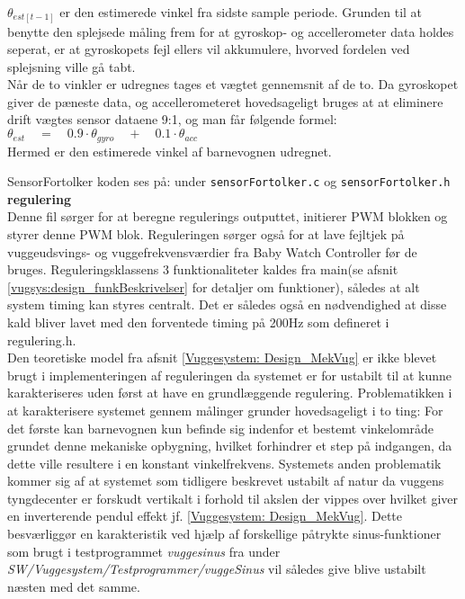 ${ \theta  }_{ est\left[ t-1 \right]  }$ er den estimerede vinkel fra sidste sample periode. Grunden til at benytte den splejsede måling frem for at gyroskop- og accellerometer data holdes seperat, er at gyroskopets fejl ellers vil akkumulere, hvorved fordelen ved splejsning ville gå tabt.\\
Når de to vinkler er udregnes tages et vægtet gennemsnit af de to. Da gyroskopet giver de pæneste data, og accellerometeret hovedsageligt bruges at at eliminere drift vægtes sensor dataene 9:1, og man får følgende formel:\\
	${ \theta  }_{ est }\quad =\quad 0.9\cdot { \theta  }_{ gyro }\quad +\quad 0.1\cdot { \theta  }_{ acc }$ \\
Hermed er den estimerede vinkel af barnevognen udregnet.

SensorFortolker koden ses på: \citep{cd} under \verb+sensorFortolker.c+ og \verb+sensorFortolker.h+\\

\textbf{regulering}\label{vuggesystem_impl:regulering}  \\
Denne fil sørger for at beregne regulerings outputtet, initierer PWM blokken og styrer denne PWM blok. Reguleringen sørger også for at lave fejltjek på vuggeudsvings- og vuggefrekvensværdier fra Baby Watch Controller før de bruges. Reguleringsklassens 3 funktionaliteter kaldes fra main(se afsnit \vref{vugsys:design_funkBeskrivelser} for detaljer om funktioner), således at alt system timing kan styres centralt. Det er således også en nødvendighed at disse kald bliver lavet med den forventede timing på 200Hz som defineret i regulering.h.\\

Den teoretiske model fra afsnit \vref{Vuggesystem: Design_MekVug} er ikke blevet brugt i implementeringen af reguleringen da systemet er for ustabilt til at kunne karakteriseres uden først at have en grundlæggende regulering. Problematikken i at karakterisere systemet gennem målinger grunder hovedsageligt i to ting: For det første kan barnevognen kun befinde sig indenfor et bestemt vinkelområde grundet denne mekaniske opbygning, hvilket forhindrer et step på indgangen, da dette ville resultere i en konstant vinkelfrekvens. Systemets anden problematik kommer sig af at systemet som tidligere beskrevet ustabilt af natur da vuggens tyngdecenter er forskudt vertikalt i forhold til akslen der vippes over hvilket giver en inverterende pendul effekt jf. \vref{Vuggesystem: Design_MekVug}. Dette besværliggør en karakteristik ved hjælp af forskellige påtrykte sinus-funktioner som brugt i testprogrammet \textit{vuggesinus} fra \citep{cd} under \textit{SW/Vuggesystem/Testprogrammer/vuggeSinus} vil således give blive ustabilt næsten med det samme.\\

